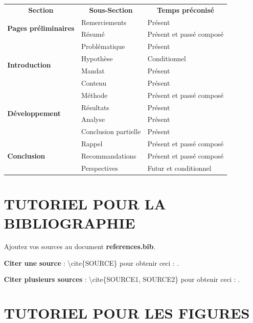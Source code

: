 \documentclass[12pt]{article} 	%
\begin{document}
{\begin{table}[!h]
\begin{tabular}{ @{}lll}
 \multicolumn{1}{c}{\bfseries{Section}} &  \multicolumn{1}{c}{\bfseries{Sous-Section}} & \multicolumn{1}{c}{\bfseries{Temps préconisé}} \\
 \cmidrule{1-3} 
\multirow{2}{*}{\bfseries{Pages préliminaires}} & \multicolumn{1}{|l|}{Remerciements}  & Présent \\
 & \multicolumn{1}{|l|}{Résumé}   & Présent et passé composé \\
  \cmidrule{1-3} 
 \multirow{4}{*}{\bfseries{Introduction}} & \multicolumn{1}{|l|}{Problématique}  & Présent \\
 & \multicolumn{1}{|l|}{Hypothèse}   & Conditionnel\\
 & \multicolumn{1}{|l|}{Mandat}   & Présent\\
 & \multicolumn{1}{|l|}{Contenu}   & Présent\\
   \cmidrule{1-3} 
 \multirow{4}{*}{\bfseries{Développement}} & \multicolumn{1}{|l|}{Méthode}  & Présent et passé composé\\
 & \multicolumn{1}{|l|}{Résultats}   & Présent\\
 & \multicolumn{1}{|l|}{Analyse}   & Présent\\
 & \multicolumn{1}{|l|}{Conclusion partielle}   & Présent\\
    \cmidrule{1-3} 
  \multirow{3}{*}{\bfseries{Conclusion}} & \multicolumn{1}{|l|}{Rappel}  & Présent et passé composé\\
 & \multicolumn{1}{|l|}{Recommandations}   & Présent et passé composé\\
 & \multicolumn{1}{|l|}{Perspectives}   & Futur et conditionnel\\

\bottomrule

\end{tabular}
\hspace*{\fill}
\end{table}

\section{TUTORIEL POUR LA BIBLIOGRAPHIE}
Ajoutez vos sources au document \textbf{references.bib}.

\textbf{Citer une source} : \textbackslash cite\{SOURCE\} pour obtenir ceci :
.

\textbf{Citer plusieurs sources} : \textbackslash cite\{SOURCE1, SOURCE2\} pour
obtenir ceci : .
\section{TUTORIEL POUR LES FIGURES}

}
\end{document}
